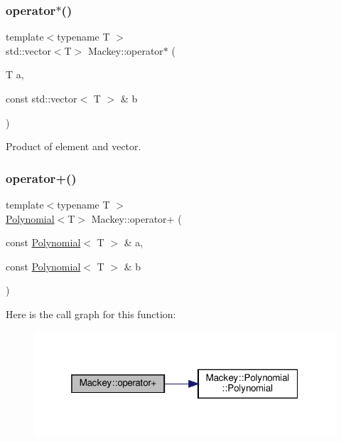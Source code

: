 \subsubsection{\texorpdfstring{operator$\ast$()}{operator*()}\hspace{0.1cm}{\footnotesize\ttfamily [2/2]}}
{\footnotesize\ttfamily template$<$typename T $>$ \\
std\+::vector$<$T$>$ Mackey\+::operator$\ast$ (\begin{DoxyParamCaption}\item[{T}]{a,  }\item[{const std\+::vector$<$ T $>$ \&}]{b }\end{DoxyParamCaption})}



Product of element and vector. 

\mbox{\label{namespaceMackey_a61f8cf9c3cf22acfedda5f427423f6c4}} 
\subsubsection{\texorpdfstring{operator+()}{operator+()}\hspace{0.1cm}{\footnotesize\ttfamily [1/3]}}
{\footnotesize\ttfamily template$<$typename T $>$ \\
\hyperlink{classMackey_1_1Polynomial}{Polynomial}$<$T$>$ Mackey\+::operator+ (\begin{DoxyParamCaption}\item[{const \hyperlink{classMackey_1_1Polynomial}{Polynomial}$<$ T $>$ \&}]{a,  }\item[{const \hyperlink{classMackey_1_1Polynomial}{Polynomial}$<$ T $>$ \&}]{b }\end{DoxyParamCaption})}

Here is the call graph for this function\+:\nopagebreak
\begin{figure}[H]
\begin{center}
\leavevmode
\includegraphics[width=319pt]{namespaceMackey_a61f8cf9c3cf22acfedda5f427423f6c4_cgraph}
\end{center}
\end{figure}
\mbox{\label{namespaceMackey_adb4974b5ffe533abb955ccb6b9096155}} 
